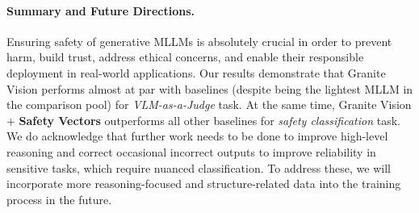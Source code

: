 




\paragraph{Summary and Future Directions.} Ensuring safety of generative MLLMs is absolutely crucial in order to prevent harm, build trust, address ethical concerns, and enable their responsible deployment in real-world applications. Our results demonstrate that Granite Vision performs almost at par with baselines (despite being the lightest MLLM in the comparison pool) for {\it VLM-as-a-Judge} task. At the same time, Granite Vision + {\bf Safety Vectors} outperforms all other baselines for {\it safety classification} task. We do acknowledge that further work needs to be done to improve high-level reasoning and correct occasional incorrect outputs to improve reliability in sensitive tasks, which require nuanced classification. To address these, we will incorporate more reasoning-focused and structure-related data into the training process in the future.


